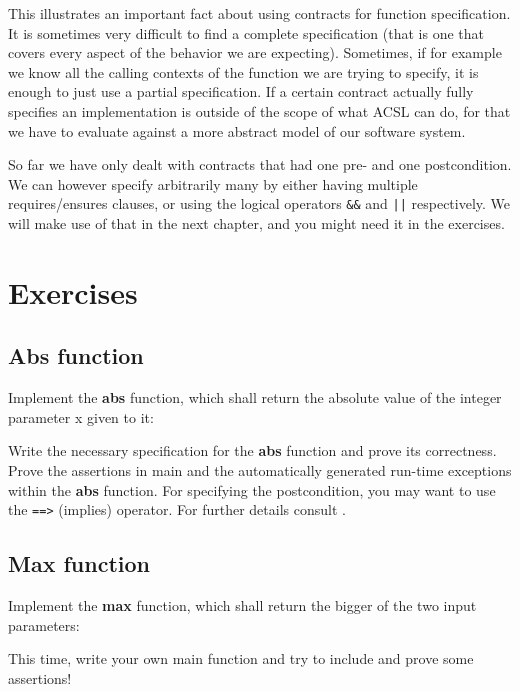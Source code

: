 This illustrates an important fact about using contracts for function specification. It is sometimes very difficult to find a complete specification (that is one that covers every aspect of the behavior we are expecting). Sometimes, if for example we know all the calling contexts of the function we are trying to specify, it is enough to just use a partial specification. If a certain contract actually fully specifies an implementation is outside of the scope of what ACSL can do, for that we have to evaluate against a more abstract model of our software system.

So far we have only dealt with contracts that had one pre- and one postcondition. We can however specify arbitrarily many by either having multiple requires/ensures clauses, or using the logical operators \texttt{&&} and \texttt{||} respectively. We will make use of that in the next chapter, and you might need it in the exercises. 

\section{Exercises}

\subsection{Abs function}

Implement the \textbf{abs} function, which shall return the absolute value of the integer parameter x given to it:


Write the necessary specification for the \textbf{abs} function and prove its correctness. Prove the assertions in main and the automatically generated run-time exceptions within the \textbf{abs} function. For specifying the postcondition, you may want to use the \texttt{==>} (implies) operator. For further details consult \cite{baudin_acsl_nodate}. 

\subsection{Max function}

Implement the \textbf{max} function, which shall return the bigger of the two input parameters:


This time, write your own main function and try to include and prove some assertions! 

